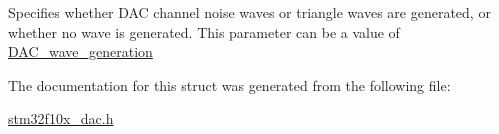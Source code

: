 \label{structDAC__InitTypeDef_a6753e78ddd2dc8273444ba01a272d63a}
Specifies whether DAC channel noise waves or triangle waves are generated, or whether no wave is generated. This parameter can be a value of \hyperlink{group__DAC__wave__generation}{DAC\_\-wave\_\-generation} 

The documentation for this struct was generated from the following file:\begin{DoxyCompactItemize}
\item 
\hyperlink{stm32f10x__dac_8h}{stm32f10x\_\-dac.h}\end{DoxyCompactItemize}
